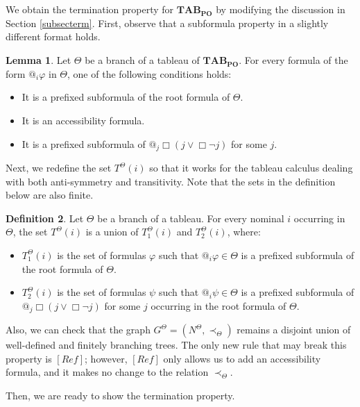\documentclass{article}
\theoremstyle{definition}
\newtheorem{definition}{Definition}[section]
\newtheorem{lemma}[definition]{Lemma}
\newcommand{\reflex}{\mathit{Ref}}
\newcommand{\tableauPO}{\mathbf{TAB}_{\textbf{PO}}}
\begin{document}
We obtain the termination property for $\tableauPO$ by modifying the discussion in Section \ref{subsecterm}. First, observe that a subformula property in a slightly different format holds.

\begin{lemma}
  Let $\Theta$ be a branch of a tableau of $\tableauPO$. For every formula of the form $@_i \varphi$ in $\Theta$, one of the following conditions holds:
  \begin{itemize}
      \item It is a prefixed subformula of the root formula of $\Theta$.
      \item It is an accessibility formula.
      \item It is a prefixed subformula of $@_j \Box (j \lor \Box \neg j)$ for some $j$.
  \end{itemize}
  \label{lemquasiPO}
\end{lemma}

Next, we redefine the set $T^\Theta(i)$ so that it works for the tableau calculus dealing with both anti-symmetry and transitivity. Note that the sets in the definition below are also finite.
\begin{definition}
  Let $\Theta$ be a branch of a tableau. For every nominal $i$ occurring in $\Theta$, the set $T^\Theta(i)$ is a union of $T_1^\Theta(i)$ and $T_2^\Theta(i)$, where:
  \begin{itemize}
      \item $T_1^\Theta(i)$ is the set of formulas $\varphi$ such that $@_i \varphi \in \Theta$ is a prefixed subformula of the root formula of $\Theta$.
      \item $T_2^\Theta(i)$ is the set of formulas $\psi$ such that $@_i \psi \in \Theta$ is a prefixed subformula of $@_j \Box (j \lor \Box \neg j)$ for some $j$ occurring in the root formula of $\Theta$.
  \end{itemize}
  \label{defTPO}
\end{definition}

Also, we can check that the graph $G^\Theta = (N^\Theta, \prec_\Theta)$ remains a disjoint union of well-defined and finitely branching trees. The only new rule that may break this property is $[\reflex]$; however, $[\reflex]$ only allows us to add an accessibility formula, and it makes no change to the relation $\prec_\Theta$.

Then, we are ready to show the termination property.
\end{document}
